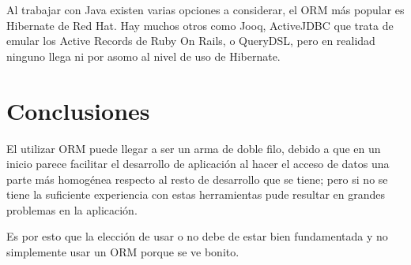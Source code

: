 \documentclass[a4paper,12pt]{article}
\begin{document}
Al trabajar con Java existen varias opciones a considerar, el ORM más popular 
es Hibernate de Red Hat. Hay muchos otros como Jooq, ActiveJDBC que trata de 
emular los Active Records de Ruby On Rails, o QueryDSL, pero en realidad ninguno 
llega ni por asomo al nivel de uso de Hibernate.

\section{Conclusiones}
El utilizar ORM puede llegar a ser un arma de doble filo, debido a que en un 
inicio parece facilitar el desarrollo de aplicación al hacer el acceso de datos 
una parte más homogénea respecto al resto de desarrollo que se tiene; pero si 
no se tiene la suficiente experiencia con estas herramientas pude resultar en 
grandes problemas en la aplicación.

Es por esto que la elección de usar o no debe de estar bien fundamentada y no 
simplemente usar un ORM porque se ve bonito.



\end{document}
